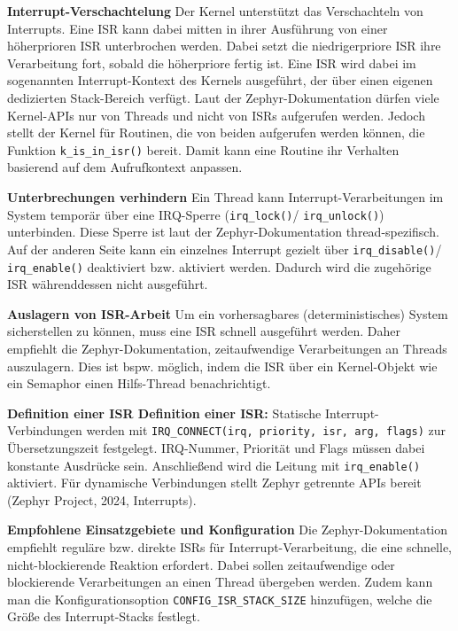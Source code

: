 \textbf{Interrupt-Verschachtelung }Der Kernel unterst{\"u}tzt das Verschachteln von Interrupts. Eine ISR kann dabei mitten in ihrer Ausf{\"u}hrung von einer h{\"o}herprioren ISR unterbrochen werden. Dabei setzt die niedrigerpriore ISR ihre Verarbeitung fort, sobald die h{\"o}herpriore fertig ist. Eine ISR wird dabei im sogenannten \glqq{}Interrupt-Kontext\grqq{} des Kernels ausgef{\"u}hrt, der {\"u}ber einen eigenen dedizierten Stack-Bereich verf{\"u}gt. Laut der Zephyr-Dokumentation d{\"u}rfen viele Kernel-APIs nur von Threads und nicht von ISRs aufgerufen werden. Jedoch stellt der Kernel f{\"u}r Routinen, die von beiden aufgerufen werden k{\"o}nnen, die Funktion \lstinline[style=codeinline]|k_is_in_isr()| bereit. Damit kann eine Routine ihr Verhalten basierend auf dem Aufrufkontext anpassen.

\textbf{Unterbrechungen verhindern }Ein Thread kann Interrupt-Verarbeitungen im System tempor{\"a}r {\"u}ber eine IRQ-Sperre (\lstinline[style=codeinline]|irq_lock()|/ \lstinline[style=codeinline]|irq_unlock()|) unterbinden. Diese Sperre ist laut der Zephyr-Dokumentation thread-spezifisch. Auf der anderen Seite kann ein einzelnes Interrupt gezielt {\"u}ber \lstinline[style=codeinline]|irq_disable()|/ \lstinline[style=codeinline]|irq_enable()| deaktiviert bzw. aktiviert werden. Dadurch wird die zugeh{\"o}rige ISR w{\"a}hrenddessen nicht ausgef{\"u}hrt.

\textbf{Auslagern von ISR-Arbeit }Um ein vorhersagbares (deterministisches) System sicherstellen zu k{\"o}nnen, muss eine ISR schnell ausgef{\"u}hrt werden. Daher empfiehlt die Zephyr-Dokumentation, zeitaufwendige Verarbeitungen an Threads auszulagern. Dies ist bspw. m{\"o}glich, indem die ISR {\"u}ber ein Kernel-Objekt wie ein Semaphor einen Hilfs-Thread benachrichtigt.

\textbf{Definition einer ISR Definition einer ISR:} Statische Interrupt-Verbindungen werden mit \lstinline[style=codeinline]|IRQ_CONNECT(irq, priority, isr, arg, flags)| zur {\"U}bersetzungszeit festgelegt. IRQ-Nummer, Priorit{\"a}t und Flags m{\"u}ssen dabei konstante Ausdr{\"u}cke sein. Anschlie{\ss}end wird die Leitung mit \lstinline[style=codeinline]|irq_enable()| aktiviert. F{\"u}r dynamische Verbindungen stellt Zephyr getrennte APIs bereit (Zephyr Project, 2024, \glqq{}Interrupts\grqq{}).

\textbf{Empfohlene Einsatzgebiete und Konfiguration }Die Zephyr-Dokumentation empfiehlt regul{\"a}re bzw. \glqq{}direkte\grqq{} ISRs f{\"u}r Interrupt-Verarbeitung, die eine schnelle, nicht-blockierende Reaktion erfordert. Dabei sollen zeitaufwendige oder blockierende Verarbeitungen an einen Thread {\"u}bergeben werden. Zudem kann man die Konfigurationsoption \lstinline[style=codeinline]|CONFIG_ISR_STACK_SIZE| hinzuf{\"u}gen, welche die Gr{\"o}{\ss}e des Interrupt-Stacks festlegt.

